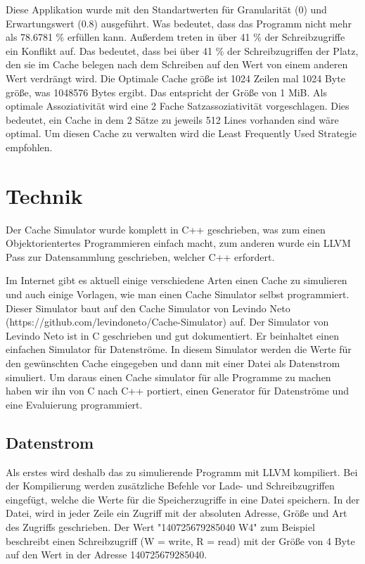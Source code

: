 \documentclass{scrreprt}
\begin{document}
Diese Applikation wurde mit den Standartwerten für Granularität (0) und Erwartungswert (0.8) ausgeführt. Was bedeutet, dass das Programm nicht mehr als 78.6781 \% erfüllen kann. \newline
Außerdem treten in über 41 \% der Schreibzugriffe ein Konflikt auf. Das bedeutet, dass bei über 41 \% der Schreibzugriffen der Platz, den sie im Cache belegen nach dem Schreiben auf den Wert von einem anderen Wert verdrängt wird. \newline
Die Optimale Cache größe ist 1024 Zeilen mal 1024 Byte größe, was 1048576 Bytes ergibt. Das entspricht der Größe von 1 MiB.\newline
Als optimale Assoziativität wird eine 2 Fache Satzassoziativität vorgeschlagen. Dies bedeutet, ein Cache in dem 2 Sätze zu jeweils 512 Lines vorhanden sind wäre optimal. \newline
Um diesen Cache zu verwalten wird die Least Frequently Used Strategie empfohlen.

\chapter{Technik}

Der Cache Simulator wurde komplett in C++ geschrieben, was zum einen Objektorientertes Programmieren einfach macht, zum anderen wurde ein LLVM Pass zur Datensammlung geschrieben, welcher C++ erfordert. \newline

Im Internet gibt es aktuell einige verschiedene Arten einen Cache zu simulieren und auch einige Vorlagen, wie man einen Cache Simulator selbst programmiert. Dieser Simulator baut auf den Cache Simulator von Levindo Neto (https://github.com/levindoneto/Cache-Simulator) auf. Der Simulator von Levindo Neto ist in C geschrieben und gut dokumentiert. Er beinhaltet einen einfachen Simulator für Datenströme. In diesem Simulator werden die Werte für den gewünschten Cache eingegeben und dann mit einer Datei als Datenstrom simuliert.\newline
Um daraus einen Cache simulator für alle Programme zu machen haben wir ihn von C nach C++ portiert, einen Generator für Datenströme und eine Evaluierung programmiert.

\section{Datenstrom}
Als erstes wird deshalb das zu simulierende Programm mit LLVM kompiliert. Bei der Kompilierung werden zusätzliche Befehle vor Lade- und Schreibzugriffen eingefügt, welche die Werte für die Speicherzugriffe in eine Datei speichern. In der Datei, wird in jeder Zeile ein Zugriff mit der absoluten Adresse, Größe und Art des Zugriffs geschrieben. Der Wert "140725679285040 W4" zum Beispiel beschreibt einen Schreibzugriff (W = write, R = read) mit der Größe von 4 Byte auf den Wert in der Adresse 140725679285040.\newline
\end{document}
